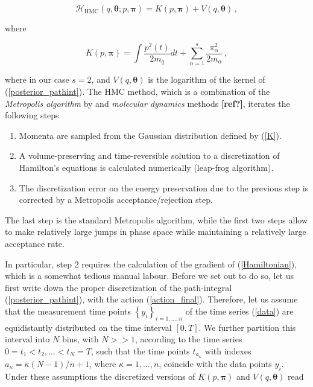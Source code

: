 \documentclass[11pt, a4paper]{article}
\newcommand{\bt}{\pmb\theta}
\begin{document}
\begin{equation}\label{Hamiltonian}
    \mathcal{H}_{\text{HMC}}(q,\bt; p,{\pmb\pi})
    =
    K( p,{\pmb\pi}) + V( q,\bt)\,,
\end{equation}

where

\begin{equation}\label{K}
   K( p,{\pmb\pi})
   =
   \int \frac{ p^2(t)}{2m_q}dt
   + \sum_{\alpha=1}^s\frac{\pi_\alpha^2}{2m_\alpha}\,,
\end{equation}

where in our case $s=2$, and $V( q,\bt)$ is the logarithm of the kernel of (\ref{posterior_pathint}).
The HMC method, which is a combination of the {\em Metropolis algorithm} by \cite{metropolis_1953_MRT2} and {\em molecular dynamics} methods \textbf{[ref?]}, iterates the following steps

\begin{enumerate}
  \item
  Momenta are sampled from the Gaussian distribution defined by (\ref{K}).
  \item
  A volume-preserving and time-reversible solution to a discretization of Hamilton's equations is calculated numerically (leap-frog algorithm).
  \item
  The discretization error on the energy preservation due to the previous step is corrected by a Metropolis acceptance/rejection step.
\end{enumerate}

The last step is the standard Metropolis algorithm, while the first two steps allow to make relatively large jumps in phase space while maintaining a relatively large acceptance rate.

In particular, step 2 requires the calculation of the gradient of (\ref{Hamiltonian}), which is a somewhat tedious manual labour.
Before we set out to do so, let us first write down the proper discretization of the path-integral (\ref{posterior_pathint}), with the action (\ref{action_final}).
Therefore, let us assume that the measurement time points $\left\{ y_i \right\}_{i=1,\dots, n}$ of the time series (\ref{data}) are equidistantly distributed on the time interval $[0,T]$.
We further partition this interval into $N$ bins, with $N >> 1$, according to the time series $0=t_1<t_2,\dots<t_N=T$, such that the time points $t_{a_{\kappa}}$ with indexes $a_{\kappa} = \kappa (N-1)/n + 1$, where $\kappa = 1,\dots, n$, coincide with the data points $y_i$.
Under these assumptions the discretized versions of $K( p,{\pmb\pi})$ and $V( q,\bt)$ read
\end{document}
